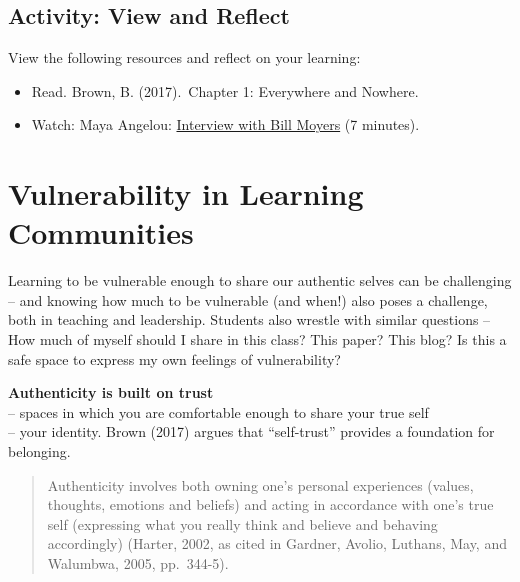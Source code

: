 \documentclass[
]{book}
\providecommand{\tightlist}{%
  \setlength{\itemsep}{0pt}\setlength{\parskip}{0pt}}
\begin{document}
\hypertarget{activity-view-and-reflect}{%
\subsection*{Activity: View and Reflect}\label{activity-view-and-reflect}}

\begin{reflect}
View the following resources and reflect on your learning:

\begin{itemize}
\tightlist
\item
  Read. Brown, B. (2017).~Chapter 1: Everywhere and Nowhere.\\
\item
  Watch: Maya Angelou: \href{http://billmoyers.com/content/conversation-maya-angelou/}{Interview with Bill Moyers} (7 minutes).
\end{itemize}
\end{reflect}

\hypertarget{vulnerability-in-learning-communities}{%
\section{Vulnerability in Learning Communities}\label{vulnerability-in-learning-communities}}

Learning to be vulnerable enough to share our authentic selves can be challenging -- and knowing how much to be vulnerable (and when!) also poses a challenge, both in teaching and leadership. Students also wrestle with similar questions -- How much of myself should I share in this class? This paper? This blog? Is this a safe space to express my own feelings of vulnerability?

\textbf{Authenticity is built on trust}\\
-- spaces in which you are comfortable enough to share your true self\\
-- your identity. Brown (2017) argues that ``self-trust'' provides a foundation for belonging.

\begin{quote}
Authenticity involves both owning one's personal experiences (values, thoughts, emotions and beliefs) and acting in accordance with one's true self (expressing what you really think and believe and behaving accordingly) (Harter, 2002, as cited in Gardner, Avolio, Luthans, May, and Walumbwa, 2005, pp.~344-5).
\end{quote}
\end{document}
